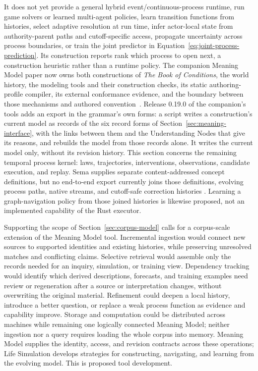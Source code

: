 \documentclass[10pt]{article}
\newcommand{\Book}{\textit{The Book of Conditions}}
\begin{document}
It does not yet provide a general hybrid event/continuous-process runtime, run
game solvers or learned multi-agent policies,
learn transition functions from histories, select adaptive resolution at run
time, infer actor-local state from authority-parent paths and cutoff-specific
access, propagate uncertainty across process boundaries, or train the joint
predictor in Equation~\ref{eq:joint-process-prediction}. Its construction
reports rank which process to open next, a construction heuristic rather than
a runtime policy. The companion Meaning Model paper now owns both constructions
of \Book{}, the world history, the modeling tools and their construction
checks, its static authoring-profile compiler, its external conformance
evidence, and the boundary between those mechanisms and authored
convention~\cite{westerbergMeaning2026}. Release 0.19.0 of the companion's tools adds
an export in the grammar's own forms: a script writes a construction's current model
as records of the six record forms of Section~\ref{sec:meaning-interface}, with the
links between them and the Understanding Nodes that give its reasons, and rebuilds
the model from those records alone. It writes the current model only, without its
revision history.
This section concerns the
remaining temporal process kernel: laws, trajectories, interventions,
observations, candidate execution, and replay. Sema supplies separate
content-addressed concept definitions, but no end-to-end export currently joins
those definitions, evolving process paths, native streams, and cutoff-safe
correction histories \cite{westerbergSema2026}.
Learning a graph-navigation policy from those joined histories is likewise
proposed, not an implemented capability of the Rust executor.

Supporting the scope of Section~\ref{sec:corpus-model} calls for a corpus-scale extension of the Meaning Model
tool. Incremental ingestion would connect new sources to supported identities
and existing histories, while preserving unresolved matches and conflicting
claims. Selective retrieval would assemble only the records needed for an
inquiry, simulation, or training view. Dependency tracking would identify which
derived descriptions, forecasts, and training examples need review or
regeneration after a source or interpretation changes, without overwriting
the original material. Refinement could deepen a local history, introduce a
better question, or replace a weak process function as evidence and capability
improve. Storage and computation could be distributed across machines while
remaining one logically connected Meaning Model; neither ingestion nor a
query requires loading the whole corpus into memory. Meaning Model supplies
the identity, access, and revision contracts across these operations; Life
Simulation develops strategies for constructing, navigating, and learning
from the evolving model. This is proposed tool development.
\end{document}
